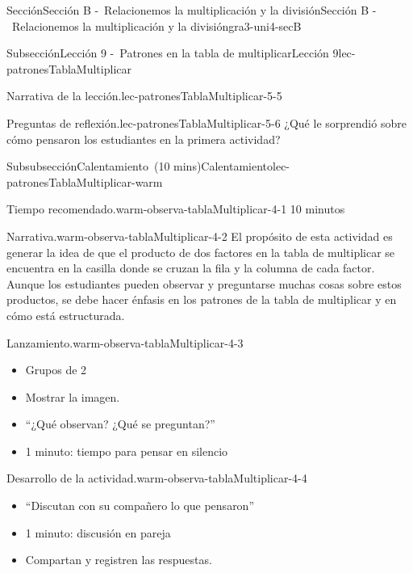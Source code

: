 \documentclass[oneside,10pt,]{article}
\begin{document}
\begin{sectionptx}{Sección}{Sección B -~Relacionemos la multiplicación y la división}{}{Sección B -~Relacionemos la multiplicación y la división}{}{}{gra3-uni4-secB}
\begin{subsectionptx}{Subsección}{Lección 9 -~Patrones en la tabla de multiplicar}{}{Lección 9}{}{}{lec-patronesTablaMultiplicar}
\begin{introduction}{}
\begin{paragraphs}{Narrativa de la lección.}{lec-patronesTablaMultiplicar-5-5}
\end{paragraphs}%
\begin{paragraphs}{Preguntas de reflexión.}{lec-patronesTablaMultiplicar-5-6}%
¿Qué le sorprendió sobre cómo pensaron los estudiantes en la primera actividad?%
\end{paragraphs}%
\end{introduction}%
%
%
\typeout{************************************************}
\typeout{************************************************}
%
\begin{subsubsectionptx}{Subsubsección}{Calentamiento~(10 mins)}{}{Calentamiento}{}{}{lec-patronesTablaMultiplicar-warm}
\par
\begin{paragraphs}{Tiempo recomendado.}{warm-observa-tablaMultiplicar-4-1}%
10 minutos%
\end{paragraphs}%
\begin{paragraphs}{Narrativa.}{warm-observa-tablaMultiplicar-4-2}%
El propósito de esta actividad es generar la idea de que el producto de dos factores en la tabla de multiplicar se encuentra en la casilla donde se cruzan la fila y la columna de cada factor. Aunque los estudiantes pueden observar y preguntarse muchas cosas sobre estos productos, se debe hacer énfasis en los patrones de la tabla de multiplicar y en cómo está estructurada.%
\end{paragraphs}%
\begin{paragraphs}{Lanzamiento.}{warm-observa-tablaMultiplicar-4-3}%
%
\begin{itemize}[label=\textbullet]
\item{}Grupos de 2%
\item{}Mostrar la imagen.%
\item{}``¿Qué observan? ¿Qué se preguntan?''%
\item{}1 minuto: tiempo para pensar en silencio%
\end{itemize}
\end{paragraphs}%
\begin{paragraphs}{Desarrollo de la actividad.}{warm-observa-tablaMultiplicar-4-4}%
%
\begin{itemize}[label=\textbullet]
\item{}``Discutan con su compañero lo que pensaron''%
\item{}1 minuto: discusión en pareja%
\item{}Compartan y registren las respuestas.%
\end{itemize}
\end{paragraphs}%

\end{subsubsectionptx}
\end{subsectionptx}
\end{sectionptx}
\end{document}
